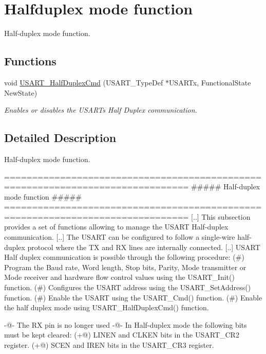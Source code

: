 \hypertarget{group___u_s_a_r_t___group5}{}\section{Halfduplex mode function}
\label{group___u_s_a_r_t___group5}


Half-\/duplex mode function.  


\subsection*{Functions}
\begin{DoxyCompactItemize}
\item 
void \mbox{\hyperlink{group___u_s_a_r_t___group5_gaaa23b05fe0e1896bad90da7f82750831}{U\+S\+A\+R\+T\+\_\+\+Half\+Duplex\+Cmd}} (U\+S\+A\+R\+T\+\_\+\+Type\+Def $\ast$U\+S\+A\+R\+Tx, Functional\+State New\+State)
\begin{DoxyCompactList}\small\item\em Enables or disables the U\+S\+A\+RT\textquotesingle{}s Half Duplex communication. \end{DoxyCompactList}\end{DoxyCompactItemize}


\subsection{Detailed Description}
Half-\/duplex mode function. 

\begin{DoxyVerb} ===============================================================================
                    ##### Half-duplex mode function #####
 ===============================================================================  
    [..]
    This subsection provides a set of functions allowing to manage the USART 
    Half-duplex communication.
    [..]
    The USART can be configured to follow a single-wire half-duplex protocol where 
    the TX and RX lines are internally connected.
    [..]
    USART Half duplex communication is possible through the following procedure:
      (#) Program the Baud rate, Word length, Stop bits, Parity, Mode transmitter 
          or Mode receiver and hardware flow control values using the USART_Init()
          function.
      (#) Configures the USART address using the USART_SetAddress() function.
      (#) Enable the USART using the USART_Cmd() function.
      (#) Enable the half duplex mode using USART_HalfDuplexCmd() function.


    -@- The RX pin is no longer used
    -@- In Half-duplex mode the following bits must be kept cleared:
      (+@) LINEN and CLKEN bits in the USART_CR2 register.
      (+@) SCEN and IREN bits in the USART_CR3 register.\end{DoxyVerb}
 

